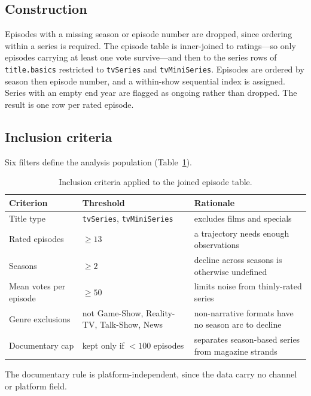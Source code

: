 \documentclass[11pt,a4paper]{article}
\begin{document}
\FloatBarrier
\subsection{Construction}

Episodes with a missing season or episode number are dropped, since ordering
within a series is required. The episode table is inner-joined to ratings---so
only episodes carrying at least one vote survive---and then to the series rows
of \texttt{title.basics} restricted to \texttt{tvSeries} and
\texttt{tvMiniSeries}. Episodes are ordered by season then episode number, and
a within-show sequential index is assigned. Series with an empty end year are
flagged as ongoing rather than dropped. The result is one row per rated
episode.

\FloatBarrier
\subsection{Inclusion criteria}

Six filters define the analysis population (Table~\ref{tab:incl}).

\begin{table}[htbp]
\centering
\small
\caption{Inclusion criteria applied to the joined episode table.}
\label{tab:incl}
\begin{tabular}{p{3.6cm}p{4.0cm}p{5.2cm}}
\toprule
\textbf{Criterion} & \textbf{Threshold} & \textbf{Rationale} \\
\midrule
Title type & \texttt{tvSeries}, \texttt{tvMiniSeries} & excludes films and specials \\
Rated episodes & $\ge 13$ & a trajectory needs enough observations \\
Seasons & $\ge 2$ & decline across seasons is otherwise undefined \\
Mean votes per episode & $\ge 50$ & limits noise from thinly-rated series \\
Genre exclusions & not Game-Show, Reality-TV, Talk-Show, News & non-narrative formats have no season arc to decline \\
Documentary cap & kept only if $<100$ episodes & separates season-based series from magazine strands \\
\bottomrule
\end{tabular}
\end{table}

The documentary rule is platform-independent, since the data carry no channel
or platform field.

\FloatBarrier
\end{document}
